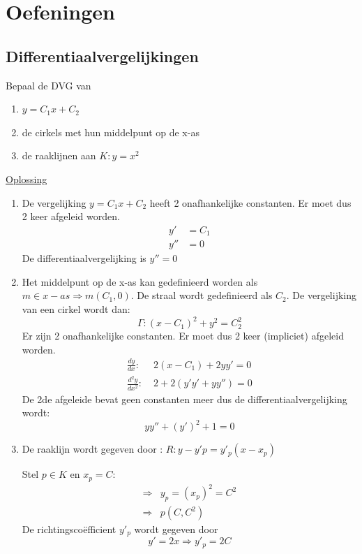 \documentclass[12pt]{report}
\newcommand{\exercise}[2]{
  #1
  

  \underline{Oplossing}
  
  #2
  
  \hrulefill
}
\begin{document}
\part{Oefeningen}
\chapter{Differentiaalvergelijkingen}
\exercise{Bepaal de DVG van \begin{enumerate}
                          \item $y = C_1x + C_2$
                          \item de cirkels met hun middelpunt op de x-as 
                          \item de raaklijnen aan $K: y = x^2$
                         \end{enumerate}}
{
\begin{enumerate}
 \item De vergelijking $y = C_1x + C_2$ heeft 2 onafhankelijke constanten. Er moet dus 2 keer afgeleid worden.
 \begin{equation*}
  \begin{split}
   y' & = C_1 \\
   y'' & = 0
  \end{split}
 \end{equation*}
 De differentiaalvergelijking is $y'' = 0$
 \item Het middelpunt op de x-as kan gedefinieerd worden als $m \in x-as \Rightarrow m(C_1, 0)$. De straal wordt gedefinieerd als $C_2$. De vergelijking van een cirkel wordt dan:
 $$\Gamma: (x - C_1)^2 + y^2 = C_2^2$$
 Er zijn 2 onafhankelijke constanten. Er moet dus 2 keer (impliciet) afgeleid worden.
 \begin{equation*}
  \begin{split}
   \frac{dy}{dx} :\; & 2(x - C_1) + 2yy' = 0 \\
   \frac{d^2y}{dx^2} :\; & 2 + 2(y'y' + yy'') = 0
  \end{split}
 \end{equation*}
 De 2de afgeleide bevat geen constanten meer dus de differentiaalvergelijking wordt: 
 $$yy'' + (y')^2 + 1 = 0$$
 \item De raaklijn wordt gegeven door : $R: y - y'p = y'_p(x - x_p)$
 
 Stel $p \in K$ en $x_p = C$:
 \begin{equation*}
  \begin{split}
   \Rightarrow & y_p = (x_p)^2 = C^2 \\
   \Rightarrow & p(C, C^2)
  \end{split}
 \end{equation*}
  De richtingscoëfficient $y'_p$ wordt gegeven door 
  $$y'= 2x \Rightarrow y'_p = 2C$$
  

\end{enumerate}}
\end{document}

